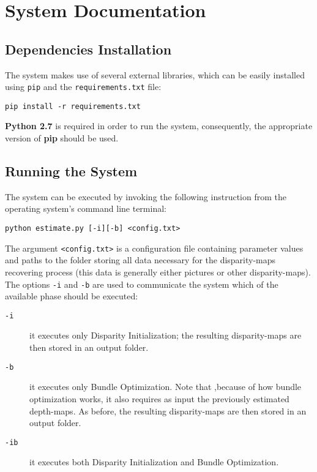 
\chapter{System Documentation}
\newcommand{\ComputeEnergy}{\texttt{compute\_energy}}
\newcommand{\Estimate}{\texttt{estimate}}
\newcommand{\Lbp}{\texttt{lbp}}
\newcommand{\Utils}{\texttt{utils}}
\newcommand{\Params}{\texttt{params}}

\section{Dependencies Installation}
The system makes use of several external libraries, which can be easily installed using \texttt{pip} and the \texttt{requirements.txt} file:
\begin{lstlisting}[stepnumber=0]
pip install -r requirements.txt
\end{lstlisting}
\begin{tcolorbox}[title=Note:]
\textbf{Python 2.7} is required in order to run the system, consequently, the appropriate version of \textbf{pip} should be used. 
\end{tcolorbox}

\section{Running the System}
The system can be executed by invoking the following instruction from the operating system's command line terminal:
\begin{lstlisting}[stepnumber=0]
	python estimate.py [-i][-b] <config.txt>
\end{lstlisting}
The argument \texttt{<config.txt>} is a configuration file containing parameter values and paths to the folder storing all data necessary for the disparity-maps recovering process (this data is generally either pictures or other disparity-maps).
The options \texttt{-i} and \texttt{-b} are used to communicate the system which  of the available phase should be executed:
\begin{description}
	\item[\texttt{-i}] it executes only Disparity Initialization; the resulting disparity-maps are then stored in an output folder.
	\item[\texttt{-b}] it executes only Bundle Optimization. Note that ,because of how bundle optimization works, it also requires as input  the previously estimated depth-maps. As before, the resulting disparity-maps are then stored in an output folder.
	\item[\texttt{-ib}] it executes both Disparity Initialization and Bundle Optimization.
\end{description}

